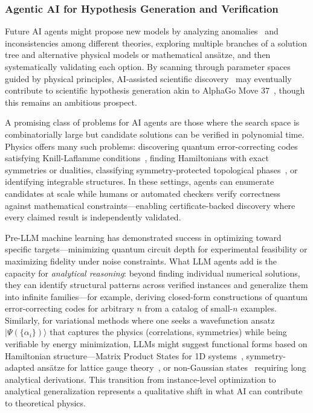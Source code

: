 \subsubsection{Agentic AI for Hypothesis Generation and Verification}
\label{sec:skill_hypothesis}
Future AI agents might propose new models by analyzing anomalies~\cite{Wang2023Scientific} and inconsistencies among different theories, exploring multiple branches of a solution tree and alternative physical models or mathematical ans{\"a}tze, and then systematically validating each option.
By scanning through parameter spaces~\cite{Wu2023AutoGen, Zhou2023Language, Besta2024Graph, Liu2024Agentbench} guided by physical principles, AI-assisted scientific discovery~\cite{Lu2024AI, Wang2023Scientific} may eventually contribute to scientific hypothesis generation akin to AlphaGo Move 37~\cite{Silver2016Mastering,Silver2017Mastering}, though this remains an ambitious prospect.

A promising class of problems for AI agents are those where the search space is combinatorially large but candidate solutions can be verified in polynomial time. Physics offers many such problems: discovering quantum error-correcting codes satisfying Knill-Laflamme conditions~\cite{Knill1997Theory}, finding Hamiltonians with exact symmetries or dualities, classifying symmetry-protected topological phases~\cite{Chen2012SymmetryProtected}, or identifying integrable structures. In these settings, agents can enumerate candidates at scale while humans or automated checkers verify correctness against mathematical constraints---enabling certificate-backed discovery where every claimed result is independently validated.

Pre-LLM machine learning has demonstrated success in optimizing toward specific targets---minimizing quantum circuit depth for experimental feasibility or maximizing fidelity under noise constraints. What LLM agents add is the capacity for \emph{analytical reasoning}: beyond finding individual numerical solutions, they can identify structural patterns across verified instances and generalize them into infinite families---for example, deriving closed-form constructions of quantum error-correcting codes for arbitrary $n$ from a catalog of small-$n$ examples. Similarly, for variational methods where one seeks a wavefunction ansatz $|\Psi(\{\alpha_i\})\rangle$ that captures the physics (correlations, symmetries) while being verifiable by energy minimization, LLMs might suggest functional forms based on Hamiltonian structure---Matrix Product States for 1D systems~\cite{Cirac2021Matrix}, symmetry-adapted ans\"atze for lattice gauge theory~\cite{Zohar2018Combining,Bender2023Variational}, or non-Gaussian states~\cite{Shi2017Variational} requiring long analytical derivations. This transition from instance-level optimization to analytical generalization represents a qualitative shift in what AI can contribute to theoretical physics.

